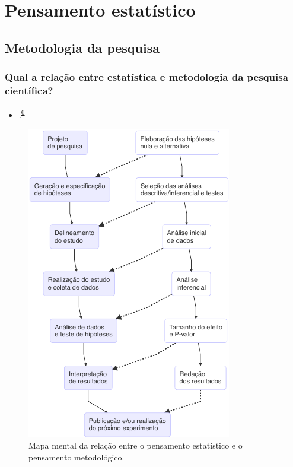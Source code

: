 \documentclass[
  a4paper,
]{book}
\providecommand{\tightlist}{%
  \setlength{\itemsep}{0pt}\setlength{\parskip}{0pt}}
\begin{document}
\hypertarget{pensamento-estatistico}{%
\chapter{\texorpdfstring{\textbf{Pensamento estatístico}}{Pensamento estatístico}}\label{pensamento-estatistico}}

\hypertarget{metodologia-da-pesquisa}{%
\section{Metodologia da pesquisa}\label{metodologia-da-pesquisa}}

\hypertarget{qual-a-relauxe7uxe3o-entre-estatuxedstica-e-metodologia-da-pesquisa-cientuxedfica}{%
\subsection{Qual a relação entre estatística e metodologia da pesquisa científica?}\label{qual-a-relauxe7uxe3o-entre-estatuxedstica-e-metodologia-da-pesquisa-cientuxedfica}}

\begin{itemize}
\tightlist
\item
  .\textsuperscript{\protect\hyperlink{ref-munafuxf22017}{6}}
\end{itemize}

\begin{figure}

{\centering \includegraphics{Ciencia-com-R_files/figure-latex/unnamed-chunk-2-1} 

}

\caption{Mapa mental da relação entre o pensamento estatístico e o pensamento metodológico.}\label{fig:unnamed-chunk-2}
\end{figure}
\end{document}

